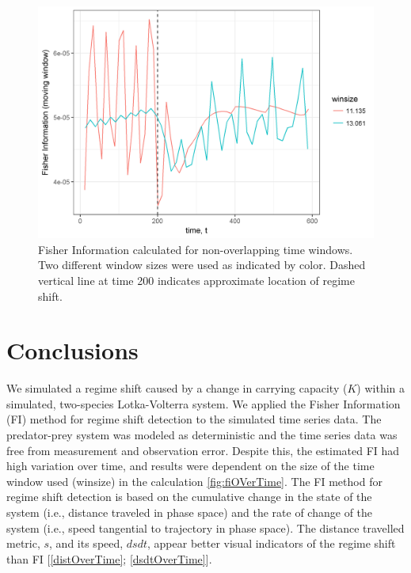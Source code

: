 \documentclass[12pt,twoside]{reedthesis}
\begin{document}
\begin{figure}

{\centering \includegraphics[width=0.85\linewidth]{./chapterFiles/fiGuide/figures/fiOverTime} 

}

\caption{Fisher Information calculated for non-overlapping time windows. Two different window sizes were used as indicated by color. Dashed vertical line at time 200 indicates approximate location of regime shift.}\label{fig:fiOverTime}
\end{figure}
\hypertarget{conclusions}{%
\section{Conclusions}\label{conclusions}}

We simulated a regime shift caused by a change in carrying capacity (\(K\)) within a simulated, two-species Lotka-Volterra system. We applied the Fisher Information (FI) method for regime shift detection to the simulated time series data. The predator-prey system was modeled as deterministic and the time series data was free from measurement and observation error. Despite this, the estimated FI had high variation over time, and results were dependent on the size of the time window used (winsize) in the calculation \ref{fig:fiOVerTime}. The FI method for regime shift detection is based on the cumulative change in the state of the system (i.e., distance traveled in phase space) and the rate of change of the system (i.e., speed tangential to trajectory in phase space). The distance travelled metric, \(s\), and its speed, \(dsdt\), appear better visual indicators of the regime shift than FI {[}\ref{distOverTime}; \ref{dsdtOverTime}{]}.
\end{document}
